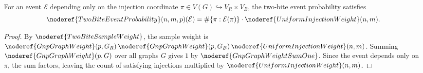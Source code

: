 \begin{lemma}
For an event \(\mathcal E\) depending only on the injection coordinate \(\pi\in V(G)\hookrightarrow V_R\times V_B\), the two-bite event probability satisfies
\[
\noderef{TwoBiteEventProbability}(n,m,p)(\mathcal E) = \#\{\pi:\mathcal E(\pi)\} \cdot \noderef{UniformInjectionWeight}(n,m).
\]
\end{lemma}
\begin{proof}
By \(\noderef{TwoBiteSampleWeight}\), the sample weight is \(\noderef{GnpGraphWeight}(p,G_R)\,\noderef{GnpGraphWeight}(p,G_B)\,\noderef{UniformInjectionWeight}(n,m)\).
Summing \(\noderef{GnpGraphWeight}(p,G)\) over all graphs \(G\) gives \(1\) by \(\noderef{GnpGraphWeightSumOne}\).
Since the event depends only on \(\pi\), the sum factors, leaving the count of satisfying injections multiplied by \(\noderef{UniformInjectionWeight}(n,m)\).
\end{proof}
